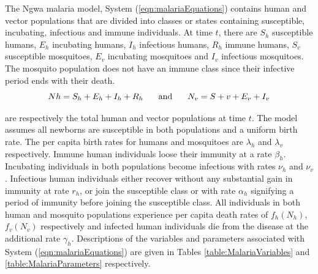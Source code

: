 \documentclass[letter,12pt, usenames,dvipsnames]{article}
\begin{document}
The Ngwa malaria model, System (\ref{eqn:malariaEquations}) contains human and vector populations that are divided into classes or states containing susceptible, incubating, infectious and immune individuals. At time $t$, there are $S_h$ susceptible humans, $E_h$ incubating humans, $I_h$ infectious humans, $R_h$ immune humans, $S_v$ susceptible mosquitoes, $E_v$ incubating mosquitoes and $I_v$
 infectious mosquitoes. The mosquito population does not have
an immune class since their infective period ends with their death. 
$$Nh = S_h + E_h + I_h + R_h
\text{\hspace*{.2in} and \hspace*{.2in}}
N_v = S+v + E_v + I_v$$

\noindent are respectively the total human and vector populations at time $t$. The
model assumes all newborns are susceptible in both populations and a
uniform birth rate. The per capita birth rates for humans and mosquitoes are $\lambda_h$ and $\lambda_v$ respectively. Immune human individuals loose their immunity at a rate $\beta_h$. Incubating individuals in both populations become infectious with rates $\nu_h$ and $\nu_v$. Infectious human individuals either recover without any substantial gain in immunity at rate $r_h$, or join the susceptible class or with rate $\alpha_h$ signifying a period of immunity before joining the susceptible class. All individuals in both human and mosquito populations experience per capita death rates of $f_h(N_h)$, $f_v(N_v)$ respectively and infected human individuals die from the disease at the additional rate $\gamma_h$.  Descriptions of the variables and parameters associated with System (\ref{eqn:malariaEquations}) are given in Tables \ref{table:MalariaVariables} and \ref{table:MalariaParameters} respectively.
\end{document}
